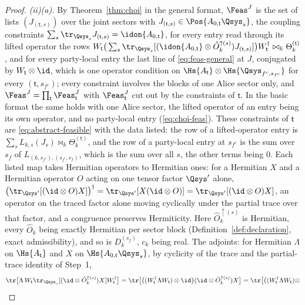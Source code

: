 \begin{proof}
\emph{(ii)(a).} By Theorem~\ref{thm:choi} in the general format, $\Feas^{J}$
is the set of lists $(J_{(\mathsf t,s)})$ over the joint sectors with
$J_{(\mathsf t,s)}\in\Pos{A_{0,\mathsf t}\Qsys_s}$, the coupling
constraints $\sum_s\tr_{\Qsys_s}J_{(\mathsf t,s)}=\idon{A_{0,\mathsf t}}$,
for every entry read through its lifted operator the rows
$W_{\mathsf t}\big(\sum_s\tr_{\Qsys_s}[(\idon{A_{0,\mathsf t}}\otimes
\hat O^{\uparrow(s)}_k)J_{(\mathsf t,s)}]\big)W_{\mathsf t}^{\dagger}
\bowtie_k\Theta^{(\mathsf t)}_k$, and for every party-local entry the last
line of \eqref{eq:feas-general} at $J$, conjugated by
$W_{\mathsf t}\otimes\id$, which is one operator condition on
$\Hs{A_{\mathsf t}}\otimes\Hs{\Qsys_{f^c,s_{f^c}}}$ for every
$(\mathsf t,s_{f^c})$; every constraint involves the blocks of one Alice
sector only, and $\Feas^{J}=\prod_{\mathsf t}\Feas^{J}_{\mathsf t}$ with
$\Feas^{J}_{\mathsf t}$ cut out by the constraints of $\mathsf t$. In the
basic format the same holds with one Alice sector, the lifted operator of an
entry being its own operator, and no party-local entry
(\eqref{eq:choi-feas}). These constraints of $\mathsf t$ are
\eqref{eq:abstract-feasible} with the data listed: the row of a
lifted-operator entry is $\sum_sL_{k,s}(J_s)\bowtie_k\Theta^{(\mathsf t)}_k$,
and the row of a party-local entry at $s_{f^c}$ is the sum over $s_f$ of
$L_{(k,s_{f^c}),(s_{f^c},s_f)}$, which is the sum over all $s$, the other
terms being $0$. Each listed map takes Hermitian operators to Hermitian ones:
for a Hermitian $X$ and a Hermitian operator $O$ acting on one tensor
factor $\Qsys'$ alone,
$\big(\tr_{\Qsys'}[(\id\otimes O)X]\big)^{\dagger}=\tr_{\Qsys'}[X(\id\otimes
O)]=\tr_{\Qsys'}[(\id\otimes O)X]$, an operator on the traced factor
alone moving cyclically under the partial trace over that factor, and a
congruence preserves Hermiticity. Here $\hat O^{\uparrow(s)}_k$ is
Hermitian, every $\hat O_k$ being exactly Hermitian per sector block
(Definition~\ref{def:declaration}, exact admissibility), and so is
$D^{(s_f)}_k$, $c_k$ being real. The adjoints: for Hermitian $\Lambda$ on
$\Hs{A_{\mathsf t}}$ and $X$ on $\Hs{A_{0,\mathsf t}\Qsys_s}$, by
cyclicity of the trace and the partial-trace identity of Step~1,
\begin{equation*}
  \tr\big[\Lambda\,W_{\mathsf t}\tr_{\Qsys_s}[(\id\otimes
  \hat O^{\uparrow(s)}_k)X]W_{\mathsf t}^{\dagger}\big]
  =\tr\big[\big((W_{\mathsf t}^{\dagger}\Lambda W_{\mathsf t})\otimes\id\big)
  (\id\otimes\hat O^{\uparrow(s)}_k)X\big]
  =\tr\big[\big((W_{\mathsf t}^{\dagger}\Lambda W_{\mathsf t})\otimes

\end{equation*}
\end{proof}

